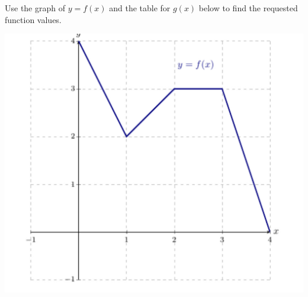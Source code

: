 \documentclass{ximera}
\author{Carl Stitz \and Jeff Zeager \and Bart Snapp \and Matthew Carr \and Bobby Ramsey}
\begin{document}
\begin{exercise}

Use the graph of $y=f(x)$ and the table for $g(x)$ below to find the
requested function values.

\begin{image}
  \includegraphics{image-D3.jpg}
\end{image}


\end{exercise}
\end{document}
